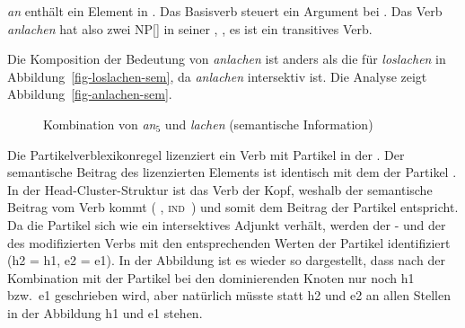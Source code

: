 \emph{an} enthält ein Element in \comps {}. Das Basisverb steuert
ein Argument bei . Das Verb \emph{anlachen} hat also zwei NP[\str] in seiner \compsl, \dash, es ist ein transitives Verb.

Die Komposition der Bedeutung von \emph{anlachen} ist anders als die für \emph{loslachen} in
Abbildung~\vref{fig-loslachen-sem}, da \emph{anlachen} intersektiv ist. Die Analyse zeigt Abbildung~\vref{fig-anlachen-sem}.
\begin{figure}
\caption{Kombination von \emph{an$_5$} und \emph{lachen} (semantische Information)}\label{fig-anlachen-sem}
\end{figure}
Die Partikelverblexikonregel lizenziert ein Verb mit Partikel in der \argstl. Der semantische
Beitrag des lizenzierten Elements ist identisch mit dem der Partikel . In der
Head-Cluster-Struktur ist das Verb der Kopf, weshalb der semantische Beitrag vom Verb kommt (\ltop
{}, \textsc{ind} \,) und somit dem Beitrag der Partikel entspricht. Da die Partikel
sich wie ein intersektives Adjunkt verhält, werden der \ltop- und der \indw des modifizierten Verbs
mit den entsprechenden Werten der Partikel identifiziert (h2 = h1, e2 = e1). In der Abbildung ist es
wieder so dargestellt, dass nach der Kombination mit der Partikel bei den dominierenden Knoten nur
noch h1 bzw.\ e1 geschrieben wird, aber natürlich müsste statt h2 und e2 an allen Stellen in der Abbildung  h1 und e1 stehen. 


